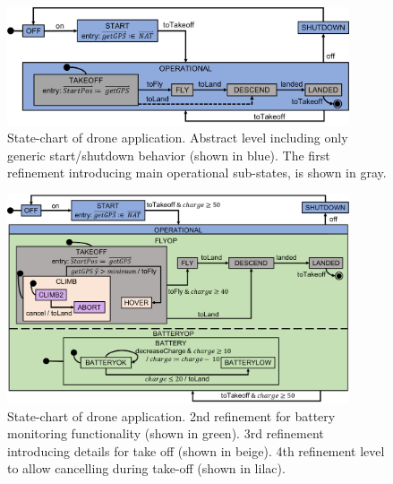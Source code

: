 \begin{figure}[]
	\vspace{-.4cm}
	\centering
	\includegraphics[width=0.90\textwidth, trim=0 40 0 0]{figures/Picture1.png}
	\caption{State-chart of drone application. Abstract level including only generic start/shutdown behavior (shown in blue). The first refinement introducing main operational sub-states, is shown in gray. }
	\label{fig:drone1}
	\vspace{-.4cm}
\end{figure} 




\begin{figure}[]
	\centering
	\includegraphics[width=0.90\textwidth, trim=0 30 0 0]{figures/Picture5.png}
	\caption{State-chart of drone application. 
		2nd refinement for battery monitoring functionality (shown in green).
		3rd refinement introducing details for take off (shown in beige).
		4th refinement level to allow cancelling during take-off (shown in lilac).}
	\label{fig:drone4}
\end{figure} 

